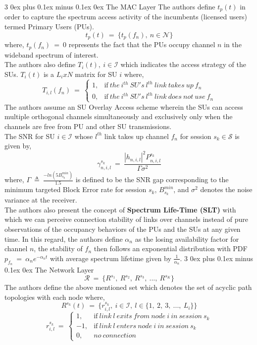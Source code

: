 \documentclass[12pt, draftcls, onecolumn]{IEEEtran}
\makeatletter
\def\subsubsection{\@startsection{subsubsection}%
                                 {3}%
                                 {\z@}%
                                 {0ex plus 0.1ex minus 0.1ex}%
                                 {0ex}%
                                 {\normalfont\normalsize\bfseries}}%
\makeatother
\begin{document}
\subsubsection{The MAC Layer}
The authors define $t_p(t)$ in order to capture the spectrum access activity of the incumbents (licensed users) termed Primary Users (PUs).
\[t_p(t)\ =\ \{t_p(f_n),\ n \in \mathcal{N}\}\]
where, $t_p(f_n)\ =\ 0$ represents the fact that the PUs occupy channel $n$ in the wideband spectrum of interest.
\\The authors also define $T_i(t),\ i \in \mathcal{I}$ which indicates the access strategy of the SUs. $T_i(t)$ is a $L_i x N$ matrix for SU $i$ where,
\begin{equation*}
    T_{i,l}(f_n)\ =\ 
    \begin{cases}
      1, & \text{if}\ the\ i^{th}\ SU's\ l^{th}\ link\ takes\ up\ f_n \\
      0, & \text{if}\ the\ i^{th}\ SU's\ l^{th}\ link\ does\ not\ use\ f_n
    \end{cases}
\end{equation*}
The authors assume an SU Overlay Access scheme wherein the SUs can access multiple orthogonal channels simultaneously and exclusively only when the channels are free from PU and other SU transmissions.
\\The SNR for SU $i \in \mathcal{I}$ whose $l^{th}$ link takes up channel $f_n$ for session $s_k \in \mathcal{S}$ is given by,
\[\gamma_{n,i,l}^{s_k}\ =\ \frac{|h_{n,i,l}|^2 P_{n,i,l}^{s_k}}{\Gamma \sigma^2}\]
where,
$\Gamma\ \triangleq\ \frac{-ln (5B_{s_k}^{min})}{1.5}$ is defined to be the SNR gap corresponding to the minimum targeted Block Error rate for session $s_k$, $B_{s_k}^{min}$, and
$\sigma^2$ denotes the noise variance at the receiver.
\\The authors also present the concept of \textbf{Spectrum Life-Time (SLT)} with which we can perceive connection stability of links over channels instead of pure observations of the occupancy behaviors of the PUs and the SUs at any given time. In this regard, the authors define $\alpha_n$ as the losing availability factor for channel $n$, the stability of $f_n$ then follows an exponential distribution with PDF
$p_{f_n}\ =\ \alpha_n e^{-\alpha_n t}$ with average spectrum lifetime given by $\frac{1}{\alpha_n}$.
\subsubsection{The Network Layer}
\[\mathcal{R}\ =\ \{R^{s_1},\ R^{s_2},\ R^{s_3},\ ...,\ R^{s_K}\}\]
The authors define the above mentioned set which denotes the set of acyclic path topologies with each node where,
\[R^{s_k}(t)\ =\ \{r_{i,l}^{s_k},\ i \in \mathcal{I},\ l \in \{1,\ 2,\ 3,\ ...,\ L_i\}\}\]
\begin{equation*}
    r_{i,l}^{s_k}\ =\ 
    \begin{cases}
      1, & \text{if}\ link\ l\ exits\ from\ node\ i\ in\ session\ s_k \\
      -1, & \text{if}\ link\ l\ enters\ node\ i\ in\ session\ s_k\\
      0, & no\ connection
    \end{cases}
\end{equation*}
\end{document}
